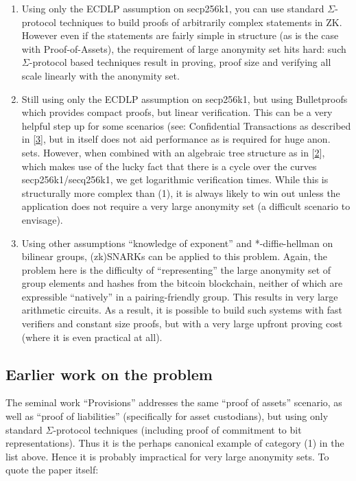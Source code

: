 \documentclass[10pt,a4paper]{article}
\begin{document}
\begin{enumerate}
\item Using only the ECDLP assumption on secp256k1, you can use standard $\Sigma$-protocol techniques to build proofs of arbitrarily complex statements in ZK. However even if the statements are fairly simple in structure (as is the case with Proof-of-Assets), the requirement of large anonymity set hits hard: such $\Sigma$-protocol based techniques result in  proving, proof size and verifying all scale linearly with the anonymity set.
\item Still using only the ECDLP assumption on secp256k1, but using Bulletproofs which provides compact proofs, but linear verification. This can be a very helpful step up for some scenarios (see: Confidential Transactions as described in {[}\protect\hyperlink{anchor-3}{3}{]}, but in itself does not aid performance as is required for huge anon. sets. However, when combined with an algebraic tree structure as in {[}\protect\hyperlink{anchor-2}{2}{]}, which makes use of the lucky fact that there is a cycle over the curves secp256k1/secq256k1, we get logarithmic verification times. While this is structurally more complex than (1), it is always likely to win out unless the application does not require a very large anonymity set (a difficult scenario to envisage).
\item Using other assumptions ``knowledge of exponent'' and *-diffie-hellman on bilinear groups, (zk)SNARKs can be applied to this problem. Again, the problem here is the difficulty of ``representing'' the large anonymity set of group elements and hashes from the bitcoin blockchain, neither of which are expressible ``natively'' in a pairing-friendly group. This results in very large arithmetic circuits. As a result, it is possible to build such systems with fast verifiers and constant size proofs, but with a very large upfront proving cost (where it is even practical at all).
\end{enumerate}

\subsection{Earlier work on the problem}

The seminal work ``Provisions'' addresses the same ``proof of assets'' scenario, as well as ``proof of liabilities'' (specifically for asset custodians), but using only standard $\Sigma$-protocol techniques (including proof of commitment to bit representations). Thus it is the perhaps canonical example of category (1) in the list above. Hence it is probably impractical for very large anonymity sets. To quote the paper itself:
\end{document}
